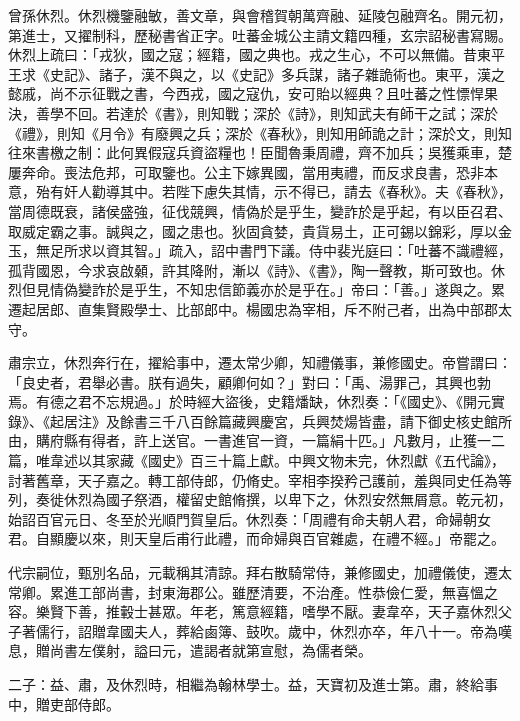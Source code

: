 \begin{pinyinscope}
 曾孫休烈。休烈機鑒融敏，善文章，與會稽賀朝萬齊融、延陵包融齊名。開元初，第進士，又擢制科，歷秘書省正字。吐蕃金城公主請文籍四種，玄宗詔秘書寫賜。休烈上疏曰：「戎狄，國之寇；經籍，國之典也。戎之生心，不可以無備。昔東平王求《史記》、諸子，漢不與之，以《史記》多兵謀，諸子雜詭術也。東平，漢之懿戚，尚不示征戰之書，今西戎，國之寇仇，安可貽以經典？且吐蕃之性慓悍果決，善學不回。若達於《書》，則知戰；深於《詩》，則知武夫有師干之試；深於《禮》，則知《月令》有廢興之兵；深於《春秋》，則知用師詭之計；深於文，則知往來書檄之制：此何異假寇兵資盜糧也！臣聞魯秉周禮，齊不加兵；吳獲乘車，楚屢奔命。喪法危邦，可取鑒也。公主下嫁異國，當用夷禮，而反求良書，恐非本意，殆有奸人勸導其中。若陛下慮失其情，示不得已，請去《春秋》。夫《春秋》，當周德既衰，諸侯盛強，征伐競興，情偽於是乎生，變詐於是乎起，有以臣召君、取威定霸之事。誠與之，國之患也。狄固貪婪，貴貨易土，正可錫以錦彩，厚以金玉，無足所求以資其智。」疏入，詔中書門下議。侍中裴光庭曰：「吐蕃不識禮經，孤背國恩，今求哀啟顙，許其降附，漸以《詩》、《書》，陶一聲教，斯可致也。休烈但見情偽變詐於是乎生，不知忠信節義亦於是乎在。」帝曰：「善。」遂與之。累遷起居郎、直集賢殿學士、比部郎中。楊國忠為宰相，斥不附己者，出為中部郡太守。



 肅宗立，休烈奔行在，擢給事中，遷太常少卿，知禮儀事，兼修國史。帝嘗謂曰：「良史者，君舉必書。朕有過失，顧卿何如？」對曰：「禹、湯罪己，其興也勃焉。有德之君不忘規過。」於時經大盜後，史籍燔缺，休烈奏：「《國史》、《開元實錄》、《起居注》及餘書三千八百餘篇藏興慶宮，兵興焚煬皆盡，請下御史核史館所由，購府縣有得者，許上送官。一書進官一資，一篇絹十匹。」凡數月，止獲一二篇，唯韋述以其家藏《國史》百三十篇上獻。中興文物未完，休烈獻《五代論》，討著舊章，天子嘉之。轉工部侍郎，仍脩史。宰相李揆矜己護前，羞與同史任為等列，奏徙休烈為國子祭酒，權留史館脩撰，以卑下之，休烈安然無屑意。乾元初，始詔百官元日、冬至於光順門賀皇后。休烈奏：「周禮有命夫朝人君，命婦朝女君。自顯慶以來，則天皇后甫行此禮，而命婦與百官雜處，在禮不經。」帝罷之。



 代宗嗣位，甄別名品，元載稱其清諒。拜右散騎常侍，兼修國史，加禮儀使，遷太常卿。累進工部尚書，封東海郡公。雖歷清要，不治產。性恭儉仁愛，無喜慍之容。樂賢下善，推轂士甚眾。年老，篤意經籍，嗜學不厭。妻韋卒，天子嘉休烈父子著儒行，詔贈韋國夫人，葬給鹵簿、鼓吹。歲中，休烈亦卒，年八十一。帝為嘆息，贈尚書左僕射，謚曰元，遣謁者就第宣慰，為儒者榮。



 二子：益、肅，及休烈時，相繼為翰林學士。益，天寶初及進士第。肅，終給事中，贈吏部侍郎。




\end{pinyinscope}
